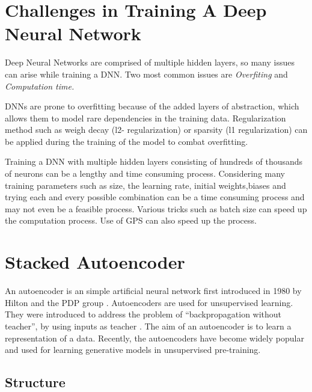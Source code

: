\documentclass[12pt, a4paper]{report}
\begin{document}
\section{Challenges in Training A Deep Neural Network}\label{challenges}

Deep Neural Networks are comprised of multiple hidden layers, so many issues can arise while training a DNN. Two most common issues are \textit{Overfiting} and \textit{Computation time.}\\ \par

DNNs are prone to overfitting because of the added layers of abstraction, which allows them to model rare dependencies in the training data. Regularization method such as weigh decay (l2- regularization) or sparsity (l1 regularization) can be applied during the training of the model to combat overfitting\cite{challenge1}.\\\par

Training a DNN with multiple hidden layers consisting of hundreds of thousands of neurons can be a lengthy and time consuming process. Considering many training parameters such as size, the learning rate, initial weights,biases and trying each and every possible combination can be a time consuming process and may not even be a feasible process\cite{challenge2}. Various tricks such as batch size can speed up the computation process. Use of GPS can also speed up the process.\\ \par

\section{Stacked Autoencoder}\label{Autoencoder}
An autoencoder is an simple artificial neural network first introduced in 1980 by Hilton and the PDP group \cite{autoencoder}. Autoencoders are used for unsupervised learning. They were introduced to address the problem of ``backpropagation without teacher'', by using inputs as teacher \cite{autoencoder2}. The aim of an autoencoder is to learn a representation of a data. Recently, the autoencoders have become widely popular and used for learning generative models in unsupervised pre-training.

\subsection{Structure}\label{structure}
\end{document}
